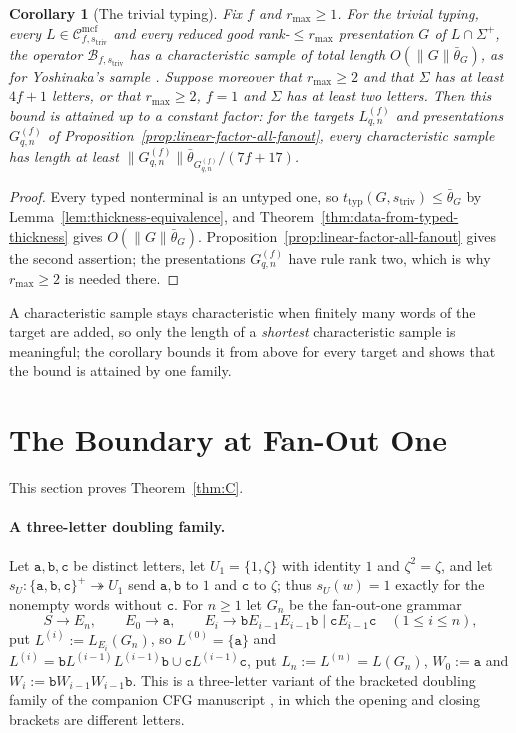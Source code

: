 \documentclass[11pt]{article}
\numberwithin{equation}{section}
\theoremstyle{plain}
\newtheorem{corollary}[theorem]{Corollary}
\theoremstyle{definition}
\theoremstyle{remark}
\newcommand{\Cmcf}[2]{\mathcal{C}^{\mathrm{mcf}}_{#1,#2}}
\theoremstyle{plain}
\begin{document}
\begin{corollary}[The trivial typing]
\label{cor:trivial-exact}
Fix $f$ and $r_{\max}\ge1$.  For the trivial typing, every
$L\in\Cmcf{f}{s_{\mathrm{triv}}}$ and every reduced good rank-$\le r_{\max}$
presentation $G$ of $L\cap\Sigma^+$, the operator $\mathcal B_{f,s_{\mathrm{triv}}}$ has
a characteristic sample of total length $O(\|G\|\bar\theta_G)$, as for Yoshinaka's
sample \cite[Lemma~7 and Theorem~1]{Yoshinaka2011}.  Suppose moreover
that $r_{\max}\ge2$ and that $\Sigma$ has at least $4f+1$ letters, or that
$r_{\max}\ge2$, $f=1$ and $\Sigma$ has at least two letters.  Then this bound is attained
up to a constant factor: for the
targets $L^{(f)}_{q,n}$ and presentations $G^{(f)}_{q,n}$ of
Proposition~\ref{prop:linear-factor-all-fanout}, every characteristic sample has
length at least $\|G^{(f)}_{q,n}\|\bar\theta_{G^{(f)}_{q,n}}/(7f+17)$.
\end{corollary}

\begin{proof}
Every typed nonterminal is an untyped one, so
$t_{\mathrm{typ}}(G,s_{\mathrm{triv}})\le\bar\theta_G$ by
Lemma~\ref{lem:thickness-equivalence}, and
Theorem~\ref{thm:data-from-typed-thickness} gives $O(\|G\|\bar\theta_G)$.
Proposition~\ref{prop:linear-factor-all-fanout} gives the second assertion;
the presentations $G^{(f)}_{q,n}$ have rule rank two, which is why
$r_{\max}\ge2$ is needed there.
\end{proof}

A characteristic sample stays characteristic when finitely many words of the
target are added, so only the length of a \emph{shortest} characteristic sample
is meaningful; the corollary bounds it from above for every target and shows
that the bound is attained by one family.

\section{The Boundary at Fan-Out One}
\label{sec:fanout-one}

This section proves Theorem~\ref{thm:C}.

\paragraph{A three-letter doubling family.}
Let $\mathtt a,\mathtt b,\mathtt c$ be distinct letters, let $U_1=\{1,\zeta\}$ with
identity $1$ and $\zeta^2=\zeta$, and let
$s_U:\{\mathtt a,\mathtt b,\mathtt c\}^+\twoheadrightarrow U_1$ send $\mathtt a,\mathtt b$
to $1$ and $\mathtt c$ to $\zeta$; thus $s_U(w)=1$ exactly for the nonempty words
without $\mathtt c$.  For $n\ge1$ let $G_n$ be the fan-out-one grammar
\[
 S\to E_n,\qquad E_0\to\mathtt a,\qquad
 E_i\to\mathtt bE_{i-1}E_{i-1}\mathtt b\mid\mathtt cE_{i-1}\mathtt c\quad(1\le i\le n),
\]
put $L^{(i)}:=L_{E_i}(G_n)$, so $L^{(0)}=\{\mathtt a\}$ and
$L^{(i)}=\mathtt bL^{(i-1)}L^{(i-1)}\mathtt b\cup\mathtt cL^{(i-1)}\mathtt c$, put
$L_n:=L^{(n)}=L(G_n)$, $W_0:=\mathtt a$ and $W_i:=\mathtt bW_{i-1}W_{i-1}\mathtt b$.
This is a three-letter variant of the bracketed doubling family of the
companion CFG manuscript \cite[Proposition~6.4]{kuriyamaCFG}, in which the
opening and closing brackets are different letters.
\end{document}

